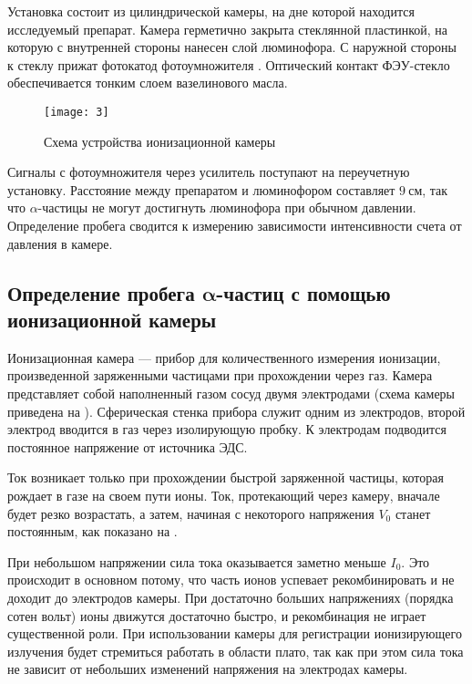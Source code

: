 \documentclass[a4paper, 12pt]{article}
\begin{document}
Установка состоит из цилиндрической камеры, на дне которой находится
исследуемый препарат. Камера герметично закрыта стеклянной пластинкой,
на которую с внутренней стороны нанесен слой люминофора. С наружной
стороны к стеклу прижат фотокатод фотоумножителя . Оптический контакт
ФЭУ-стекло обеспечивается тонким слоем вазелинового масла.

\begin{wrapfigure}[12]{r}{0.35\linewidth}
    \vspace{-10pt}
    \texttt{[image: 3]}
    \caption{Схема устройства ионизационной камеры}
    \label{fig:3}
\end{wrapfigure}


Сигналы с фотоумножителя через усилитель поступают на переучетную
установку. Расстояние между препаратом и люминофором составляет $9\:
\text{см}$, так что $\alpha$-частицы не могут достигнуть люминофора
при обычном давлении. Определение пробега сводится к измерению
зависимости интенсивности счета от давления в камере.

\subsection*{Определение пробега $\symbf{\alpha}$-частиц с помощью
ионизационной камеры}
Ионизационная камера --- прибор для количественного измерения
ионизации, произведенной заряженными частицами при прохождении через
газ. Камера представляет собой наполненный газом сосуд  двумя
электродами (схема камеры приведена на ). Сферическая
стенка прибора служит одним из электродов, второй электрод вводится в
газ через изолирующую пробку. К электродам подводится постоянное
напряжение от источника ЭДС.

Ток возникает только при прохождении быстрой заряженной частицы,
которая рождает в газе на своем пути ионы. Ток, протекающий через
камеру, вначале будет резко возрастать, а затем, начиная с некоторого
напряжения $V_0$ станет постоянным, как показано на . 

При небольшом напряжении сила тока оказывается заметно меньше $I_0$.
Это происходит в основном потому, что часть ионов успевает
рекомбинировать и не доходит до электродов камеры. При достаточно
больших напряжениях (порядка сотен вольт) ионы движутся достаточно
быстро, и рекомбинация не играет существенной роли. При использовании
камеры для регистрации ионизирующего излучения будет стремиться
работать в области плато, так как при этом сила тока не зависит от
небольших изменений напряжения на электродах камеры. 
\end{document}
